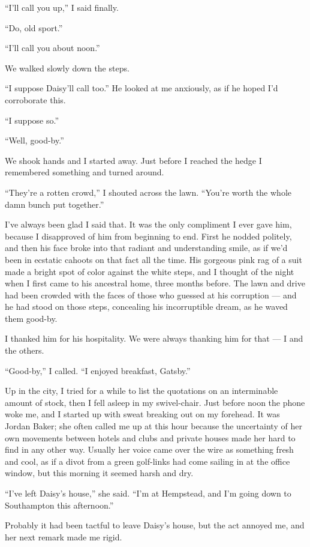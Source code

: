 \documentclass{znotebook}
\begin{document}
``I'll call you up,'' I said finally.

``Do, old sport.''

``I'll call you about noon.''

We walked slowly down the steps.

``I suppose Daisy'll call too.'' He looked at me anxiously, as if he hoped I'd corroborate this.

``I suppose so.''

``Well, good-by.''

We shook hands and I started away. Just before I reached the hedge I remembered something and turned around.

``They're a rotten crowd,'' I shouted across the lawn. ``You're worth the whole damn bunch put together.''

I've always been glad I said that. It was the only compliment I ever gave him, because I disapproved of him from beginning to end. First he nodded politely, and then his face broke into that radiant and understanding smile, as if we'd been in ecstatic cahoots on that fact all the time. His gorgeous pink rag of a suit made a bright spot of color against the white steps, and I thought of the night when I first came to his ancestral home, three months before. The lawn and drive had been crowded with the faces of those who guessed at his corruption — and he had stood on those steps, concealing his incorruptible dream, as he waved them good-by.

I thanked him for his hospitality. We were always thanking him for that — I and the others.

``Good-by,'' I called. ``I enjoyed breakfast, Gatsby.''

Up in the city, I tried for a while to list the quotations on an interminable amount of stock, then I fell asleep in my swivel-chair. Just before noon the phone woke me, and I started up with sweat breaking out on my forehead. It was Jordan Baker; she often called me up at this hour because the uncertainty of her own movements between hotels and clubs and private houses made her hard to find in any other way. Usually her voice came over the wire as something fresh and cool, as if a divot from a green golf-links had come sailing in at the office window, but this morning it seemed harsh and dry.

``I've left Daisy's house,'' she said. ``I'm at Hempstead, and I'm going down to Southampton this afternoon.''

Probably it had been tactful to leave Daisy's house, but the act annoyed me, and her next remark made me rigid.
\end{document}
